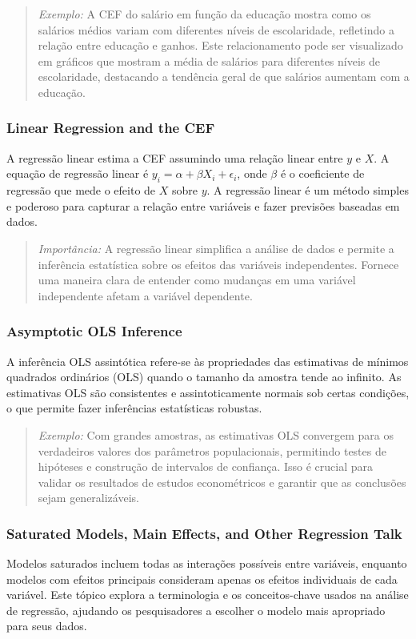 \documentclass[a4paper,12pt]{article}[abntex2]
\begin{document}
\begin{quote}
\textit{Exemplo:} A CEF do salário em função da educação mostra como os salários médios variam com diferentes níveis de escolaridade, refletindo a relação entre educação e ganhos. Este relacionamento pode ser visualizado em gráficos que mostram a média de salários para diferentes níveis de escolaridade, destacando a tendência geral de que salários aumentam com a educação.
\end{quote}

\subsubsection{Linear Regression and the CEF}
A regressão linear estima a CEF assumindo uma relação linear entre \( y \) e \( X \). A equação de regressão linear é \( y_i = \alpha + \beta X_i + \epsilon_i \), onde \( \beta \) é o coeficiente de regressão que mede o efeito de \( X \) sobre \( y \). A regressão linear é um método simples e poderoso para capturar a relação entre variáveis e fazer previsões baseadas em dados.

\begin{quote}
\textit{Importância:} A regressão linear simplifica a análise de dados e permite a inferência estatística sobre os efeitos das variáveis independentes. Fornece uma maneira clara de entender como mudanças em uma variável independente afetam a variável dependente.
\end{quote}

\subsubsection{Asymptotic OLS Inference}
A inferência OLS assintótica refere-se às propriedades das estimativas de mínimos quadrados ordinários (OLS) quando o tamanho da amostra tende ao infinito. As estimativas OLS são consistentes e assintoticamente normais sob certas condições, o que permite fazer inferências estatísticas robustas.

\begin{quote}
\textit{Exemplo:} Com grandes amostras, as estimativas OLS convergem para os verdadeiros valores dos parâmetros populacionais, permitindo testes de hipóteses e construção de intervalos de confiança. Isso é crucial para validar os resultados de estudos econométricos e garantir que as conclusões sejam generalizáveis.
\end{quote}

\subsubsection{Saturated Models, Main Effects, and Other Regression Talk}
Modelos saturados incluem todas as interações possíveis entre variáveis, enquanto modelos com efeitos principais consideram apenas os efeitos individuais de cada variável. Este tópico explora a terminologia e os conceitos-chave usados na análise de regressão, ajudando os pesquisadores a escolher o modelo mais apropriado para seus dados.
\end{document}
